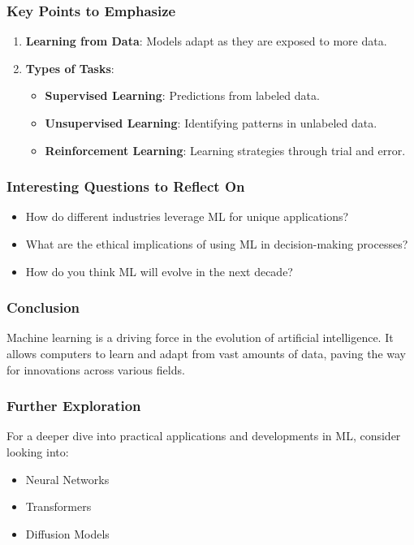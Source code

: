 \documentclass[aspectratio=169]{beamer}
\begin{document}
\begin{frame}[fragile]
    \frametitle{Key Points to Emphasize}
    \begin{enumerate}
        \item \textbf{Learning from Data}: Models adapt as they are exposed to more data.
        \item \textbf{Types of Tasks}:
        \begin{itemize}
            \item \textbf{Supervised Learning}: Predictions from labeled data.
            \item \textbf{Unsupervised Learning}: Identifying patterns in unlabeled data.
            \item \textbf{Reinforcement Learning}: Learning strategies through trial and error.
        \end{itemize}
    \end{enumerate}
\end{frame}

\begin{frame}[fragile]
    \frametitle{Interesting Questions to Reflect On}
    \begin{itemize}
        \item How do different industries leverage ML for unique applications?
        \item What are the ethical implications of using ML in decision-making processes?
        \item How do you think ML will evolve in the next decade?
    \end{itemize}
\end{frame}

\begin{frame}[fragile]
    \frametitle{Conclusion}
    Machine learning is a driving force in the evolution of artificial intelligence. It allows computers to learn and adapt from vast amounts of data, paving the way for innovations across various fields.
\end{frame}

\begin{frame}[fragile]
    \frametitle{Further Exploration}
    For a deeper dive into practical applications and developments in ML, consider looking into:
    \begin{itemize}
        \item Neural Networks
        \item Transformers
        \item Diffusion Models
    \end{itemize}
\end{frame}
\end{document}
